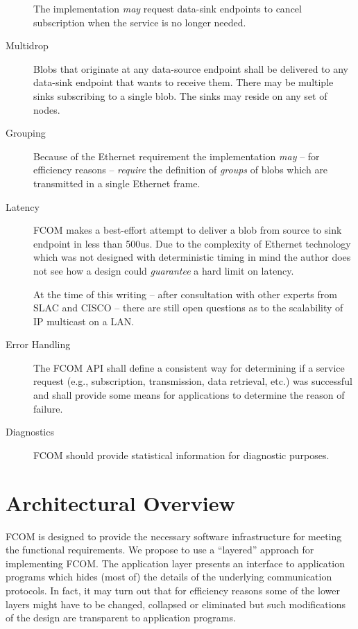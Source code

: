 \documentclass[11pt]{article}
\newcommand{\fcom}{FCOM}
\newcommand{\blob}{blob}
\newcommand{\Blob}{Blob}
\newcommand{\group}{group}
\begin{document}
\begin{description}
                    The implementation {\em may} request data-sink
                    endpoints to cancel subscription when the
                    service is no longer needed.

\item[Multidrop]    \Blob{}s that originate at any data-source endpoint
                    shall be delivered to any data-sink endpoint that wants
                    to receive them. There may be multiple sinks
                    subscribing to a single \blob{}. The sinks may
                    reside on any set of nodes.

\item[Grouping]     Because of the Ethernet requirement
                    the implementation {\em may} -- for
                    efficiency reasons -- {\em require}
                    the definition of {\em \group{}s} of
                    \blob{}s which are transmitted in a single
                    Ethernet frame.
 
\item[Latency]      \fcom{} makes a best-effort attempt to deliver 
                    a \blob{} from source to sink endpoint in 
                    less than 500us. Due to the complexity
                    of Ethernet technology which was not
                    designed with deterministic timing in mind
                    the author does not see how a design
                    could {\em guarantee} a hard limit on
                    latency.

                    At the time of this writing -- after consultation
                    with other experts from SLAC and CISCO -- there
                    are still open questions as to the scalability
                    of IP multicast on a LAN.
\item[Error Handling] The \fcom{} API shall define a consistent way
                    for determining if a service request (e.g.,
                    subscription, transmission, data retrieval, etc.)
                    was successful and shall provide some means
                    for applications to determine the reason of failure.
\item[Diagnostics]  \fcom{} should provide statistical information for
                    diagnostic purposes.
\end{description}

\section{Architectural Overview}
\fcom{} is designed to provide the necessary software infrastructure
for meeting the functional requirements. We propose to use a ``layered''
approach for implementing \fcom{}. The application layer presents
an interface to application programs which hides (most of) the
details of the underlying communication protocols. In fact,
it may turn out that for efficiency reasons some of the lower
layers might have to be changed, collapsed or eliminated but such
modifications of the design are transparent to application 
programs.
\end{document}

